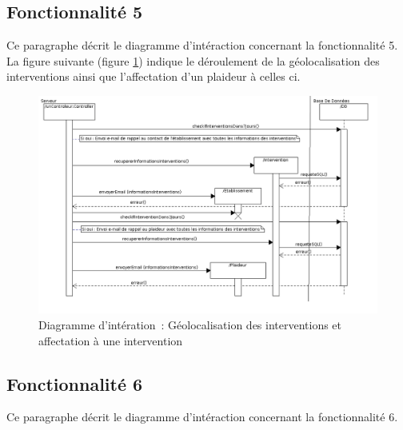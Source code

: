 \subsection{Fonctionnalité 5}
Ce paragraphe décrit le diagramme d'intéraction concernant la fonctionnalité 5. \\

La figure suivante (figure \ref{diagrammeInteraction7}) indique le déroulement de la géolocalisation des interventions ainsi que l'affectation d'un plaideur à celles ci. \\
\begin{figure}[H]
	\centering
	\includegraphics[scale=0.5]{../../lot2/DCP/images/diagrammesInteraction/07_diagrammeInteractionF5.png}
	\caption{Diagramme d'intération~: Géolocalisation des interventions et affectation à une intervention}
	\label{diagrammeInteraction7}
\end{figure}

\subsection{Fonctionnalité 6}
Ce paragraphe décrit le diagramme d'intéraction concernant la fonctionnalité 6. \\

